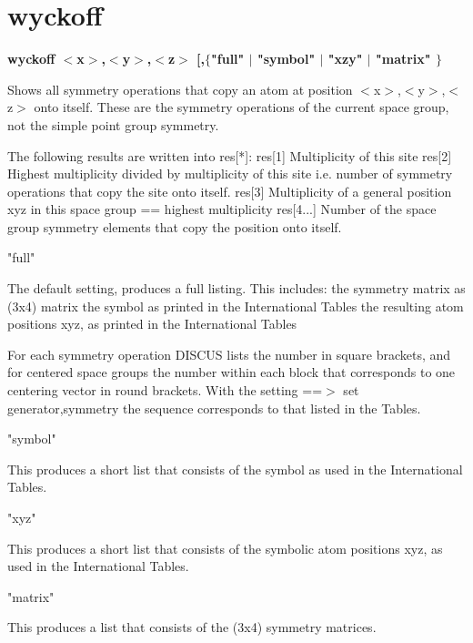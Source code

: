 \section{wyckoff}
{\bf wyckoff $ <$x$> $,$ <$y$> $,$ <$z$> $ [,$ \{$"full" $| $ "symbol" $| $ "xzy" $| $ "matrix" $\} $ \par }
\par
\vspace{3pt}
Shows all symmetry operations that copy an atom at position $ <$x$> $,$ <$y$> $,$ <$z$> $ 
onto itself. These are the symmetry operations of the current space group, 
not the simple point group symmetry. 
\par
The following results are written into res[*]: 
   res[1] Multiplicity of this site 
   res[2] Highest multiplicity divided by multiplicity of this site 
          i.e. number of symmetry operations that copy the site onto 
          itself. 
   res[3] Multiplicity of a general position xyz in this space group 
          == highest multiplicity 
   res[4...] Number of the space group symmetry elements that copy 
          the position onto itself. 
\par
\begin{MacVerbatim}
"full"
\end{MacVerbatim}
The default setting, produces a full listing. This includes: 
    the symmetry matrix as (3x4) matrix 
    the symbol as printed in the International Tables 
    the resulting atom positions xyz, as printed in the International Tables 
\par
For each symmetry operation DISCUS lists the number in square brackets, 
and for centered space groups the number within each block that corresponds 
to one centering vector in round brackets. With the setting 
==$> $ set generator,symmetry the sequence corresponds to that listed 
in the Tables. 
\par
\begin{MacVerbatim}
"symbol"
\end{MacVerbatim}
This produces a short list that consists of the symbol as used in the 
International Tables. 
\par
\begin{MacVerbatim}
"xyz"
\end{MacVerbatim}
This produces a short list that consists of the symbolic atom positions 
xyz, as used in the International Tables. 
\par
\begin{MacVerbatim}
"matrix"
\end{MacVerbatim}
This produces a list that consists of the (3x4) symmetry matrices. 
\par
